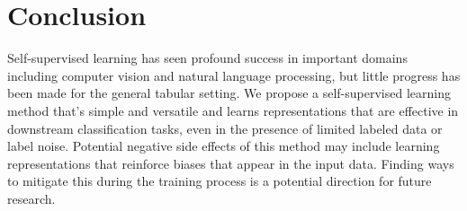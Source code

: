 \section{Conclusion}

Self-supervised learning has seen profound success in important domains including computer vision and natural language processing, but little progress has been made for the general tabular setting. We propose a self-supervised learning method that's simple and versatile and learns representations that are effective in downstream classification tasks, even in the presence of limited labeled data or label noise. Potential negative side effects of this method may include learning representations that reinforce biases that appear in the input data. Finding ways to mitigate this during the training process is a potential direction for future research.


